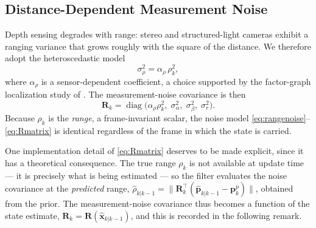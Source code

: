 \subsection{Distance-Dependent Measurement Noise}

Depth sensing degrades with range: stereo and structured-light cameras exhibit a
ranging variance that grows roughly with the square of the distance. We therefore
adopt the heteroscedastic model
\begin{equation}
  \sigma_{\rho}^{2} = \alpha_{\rho}\,\rho_k^{2},
  \label{eq:rangenoise}
\end{equation}
where $\alpha_{\rho}$ is a sensor-dependent coefficient, a choice supported by the
factor-graph localization study of \cite{fernandes2020}. The measurement-noise
covariance is then
\begin{equation}
  \bm{R}_k = \operatorname{diag}\!\big(\alpha_{\rho}\rho_k^{2},\; \sigma_{\alpha}^{2},\; \sigma_{\beta}^{2},\; \sigma_{r}^{2}\big).
  \label{eq:Rmatrix}
\end{equation}
Because $\rho_k$ is the \emph{range}, a frame-invariant scalar, the noise
model \eqref{eq:rangenoise}--\eqref{eq:Rmatrix} is identical regardless of the
frame in which the state is carried.

One implementation detail of \eqref{eq:Rmatrix} deserves to be made explicit,
since it has a theoretical consequence. The true range $\rho_k$ is not available
at update time --- it is precisely what is being estimated --- so the filter
evaluates the noise covariance at the \emph{predicted} range,
$\hat{\rho}_{k|k-1}=\lVert\bm{R}_k^{\top}(\hat{\bm{p}}_{k|k-1}-\bm{p}^{p}_k)\rVert$,
obtained from the prior. The measurement-noise covariance thus becomes a function
of the state estimate, $\bm{R}_k=\bm{R}(\hat{\bm{x}}_{k|k-1})$, and this is
recorded in the following remark.

